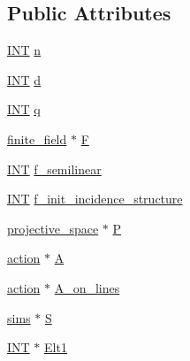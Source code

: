 \subsection*{Public Attributes}
\begin{DoxyCompactItemize}
\item 
\mbox{\hyperlink{galois_8h_a09fddde158a3a20bd2dcadb609de11dc}{I\+NT}} \mbox{\hyperlink{classprojective__space__with__action_aa438c34f24f61c86c06546e95945fdf6}{n}}
\item 
\mbox{\hyperlink{galois_8h_a09fddde158a3a20bd2dcadb609de11dc}{I\+NT}} \mbox{\hyperlink{classprojective__space__with__action_ae7716f2994f5f1afca274f5e6dc4540d}{d}}
\item 
\mbox{\hyperlink{galois_8h_a09fddde158a3a20bd2dcadb609de11dc}{I\+NT}} \mbox{\hyperlink{classprojective__space__with__action_abcc53716430d9ceb986f8385196d3d05}{q}}
\item 
\mbox{\hyperlink{classfinite__field}{finite\+\_\+field}} $\ast$ \mbox{\hyperlink{classprojective__space__with__action_ad08b5f89f664d8df95bbb8cf18077f03}{F}}
\item 
\mbox{\hyperlink{galois_8h_a09fddde158a3a20bd2dcadb609de11dc}{I\+NT}} \mbox{\hyperlink{classprojective__space__with__action_a2426720440383541ff6b5aa868c368bb}{f\+\_\+semilinear}}
\item 
\mbox{\hyperlink{galois_8h_a09fddde158a3a20bd2dcadb609de11dc}{I\+NT}} \mbox{\hyperlink{classprojective__space__with__action_acaf0ac596355e7d61c940a0517e4a419}{f\+\_\+init\+\_\+incidence\+\_\+structure}}
\item 
\mbox{\hyperlink{classprojective__space}{projective\+\_\+space}} $\ast$ \mbox{\hyperlink{classprojective__space__with__action_a3371a6d9c721634d8ee1361324b9a16e}{P}}
\item 
\mbox{\hyperlink{classaction}{action}} $\ast$ \mbox{\hyperlink{classprojective__space__with__action_a43fc7fe18c196843574a7cef81cd5064}{A}}
\item 
\mbox{\hyperlink{classaction}{action}} $\ast$ \mbox{\hyperlink{classprojective__space__with__action_ae371b6dcc54bc0471384b75fe8c3542f}{A\+\_\+on\+\_\+lines}}
\item 
\mbox{\hyperlink{classsims}{sims}} $\ast$ \mbox{\hyperlink{classprojective__space__with__action_ac3254548af04948de40d67263edbc0dc}{S}}
\item 
\mbox{\hyperlink{galois_8h_a09fddde158a3a20bd2dcadb609de11dc}{I\+NT}} $\ast$ \mbox{\hyperlink{classprojective__space__with__action_ad90cba5b396206bb4696950b6fabc404}{Elt1}}
\end{DoxyCompactItemize}


